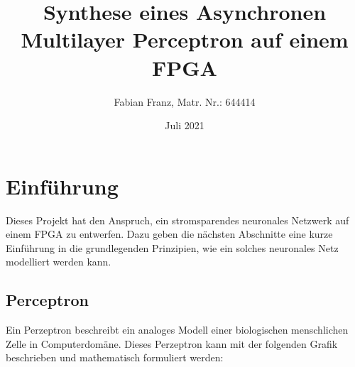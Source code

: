 \documentclass{article}
\title{Synthese eines Asynchronen Multilayer Perceptron auf einem FPGA}
\author{Fabian Franz, Matr. Nr.: 644414}
\date{Juli 2021}
\numberwithin{equation}{section}
\begin{document}
\maketitle

\pagebreak
\tableofcontents
\pagebreak

\section{Einführung}
Dieses Projekt hat den Anspruch, ein stromsparendes neuronales Netzwerk auf einem FPGA zu
entwerfen. Dazu geben die nächsten Abschnitte eine kurze Einführung in die grundlegenden
Prinzipien, wie ein solches neuronales Netz modelliert werden kann.

\subsection{Perceptron}
Ein Perzeptron beschreibt ein analoges Modell einer biologischen menschlichen Zelle in
Computerdomäne. Dieses Perzeptron kann mit der folgenden Grafik beschrieben und mathematisch
formuliert werden:
\end{document}

